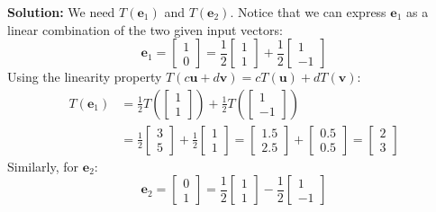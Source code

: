 \documentclass[11pt]{article}
\begin{document}
\textbf{Solution:}
We need $T(\mathbf{e}_1)$ and $T(\mathbf{e}_2)$. 
Notice that we can express $\mathbf{e}_1$ as a linear combination of the two given input vectors:
\[ \mathbf{e}_1 = \begin{bmatrix} 1 \\ 0 \end{bmatrix} = \frac{1}{2} \begin{bmatrix} 1 \\ 1 \end{bmatrix} + \frac{1}{2} \begin{bmatrix} 1 \\ -1 \end{bmatrix} \]
Using the linearity property $T(c\mathbf{u} + d\mathbf{v}) = cT(\mathbf{u}) + dT(\mathbf{v})$:
\begin{align*}
    T(\mathbf{e}_1) &= \frac{1}{2} T\left( \begin{bmatrix} 1 \\ 1 \end{bmatrix} \right) + \frac{1}{2} T\left( \begin{bmatrix} 1 \\ -1 \end{bmatrix} \right) \\
    &= \frac{1}{2} \begin{bmatrix} 3 \\ 5 \end{bmatrix} + \frac{1}{2} \begin{bmatrix} 1 \\ 1 \end{bmatrix} = \begin{bmatrix} 1.5 \\ 2.5 \end{bmatrix} + \begin{bmatrix} 0.5 \\ 0.5 \end{bmatrix} = \begin{bmatrix} 2 \\ 3 \end{bmatrix}
\end{align*}
Similarly, for $\mathbf{e}_2$:
\[ \mathbf{e}_2 = \begin{bmatrix} 0 \\ 1 \end{bmatrix} = \frac{1}{2} \begin{bmatrix} 1 \\ 1 \end{bmatrix} - \frac{1}{2} \begin{bmatrix} 1 \\ -1 \end{bmatrix} \]
\end{document}
